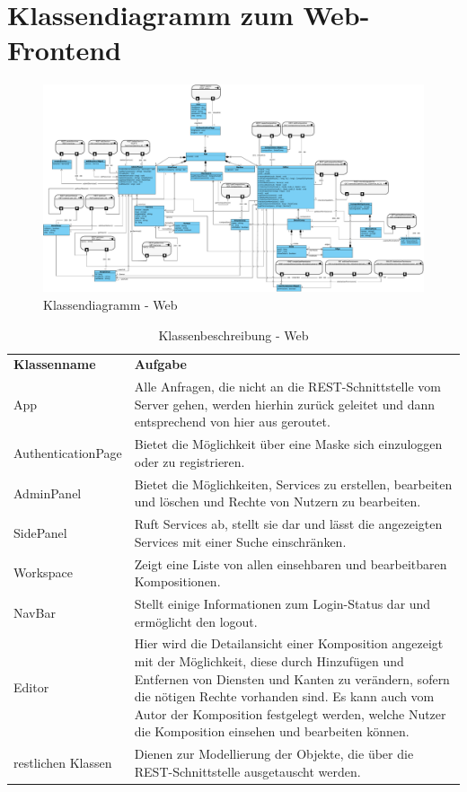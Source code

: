 \newpage
\section*{Klassendiagramm zum Web-Frontend}

\begin{figure}[h]
	\centering
	\includegraphics[width=\textwidth]{img/Diagramme/Klassen/Frontend}
	\caption{Klassendiagramm - Web}
	\label{fig:klassendiagramm-web}
\end{figure}

\begin{table}[h]
	\centering
	\begin{tabularx}{\textwidth}{X X}
		\rowcolor[HTML]{C0C0C0} 
		\textbf{Klassenname} & \textbf{Aufgabe} \\
		App & Alle Anfragen, die nicht an die REST-Schnittstelle vom Server gehen, werden hierhin zurück geleitet
		und dann entsprechend von hier aus geroutet. \\
		\rowcolor[HTML]{E7E7E7} 
		AuthenticationPage & Bietet die Möglichkeit über eine Maske sich einzuloggen oder zu registrieren. \\
		AdminPanel & Bietet die Möglichkeiten, Services zu erstellen, bearbeiten und löschen und Rechte von Nutzern zu bearbeiten. \\
		\rowcolor[HTML]{E7E7E7} 
		SidePanel & Ruft Services ab, stellt sie dar und lässt die angezeigten Services mit einer Suche einschränken. \\
		Workspace & Zeigt eine Liste von allen einsehbaren und bearbeitbaren Kompositionen. \\
		\rowcolor[HTML]{E7E7E7} 
		NavBar & Stellt einige Informationen zum Login-Status dar und ermöglicht den logout. \\
		Editor & Hier wird die Detailansicht einer Komposition angezeigt mit der Möglichkeit, diese durch Hinzufügen und Entfernen von
		Diensten und Kanten zu verändern, sofern die nötigen Rechte vorhanden sind. Es kann auch vom Autor der Komposition festgelegt
		werden, welche Nutzer die Komposition einsehen und bearbeiten können. \\
		\rowcolor[HTML]{E7E7E7} 
		restlichen Klassen & Dienen zur Modellierung der Objekte, die über die REST-Schnittstelle ausgetauscht werden. 
	\end{tabularx}
	\caption{Klassenbeschreibung - Web}
	\label{table:klassenbeschreibung-web}
\end{table}
